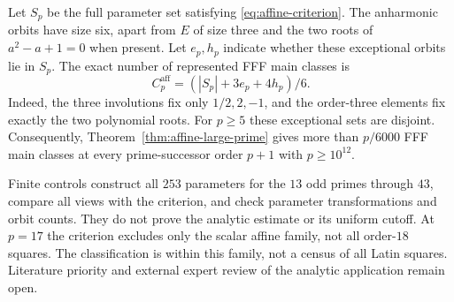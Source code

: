 Let $S_p$ be the full parameter set satisfying
\eqref{eq:affine-criterion}. The anharmonic orbits have size six,
apart from $E$ of size three and the two roots of $a^2-a+1=0$
when present. Let $e_p,h_p$ indicate whether these exceptional
orbits lie in $S_p$. The exact number of represented FFF main
classes is
\[
 C_p^{\mathrm{aff}}=(|S_p|+3e_p+4h_p)/6.
\]
Indeed, the three involutions fix only $1/2,2,-1$, and the
order-three elements fix exactly the two polynomial roots.
For $p\geq5$ these exceptional sets are disjoint. Consequently,
Theorem~\ref{thm:affine-large-prime} gives more than $p/6000$
FFF main classes at every prime-successor order $p+1$ with
$p\geq10^{12}$.

Finite controls construct all $253$ parameters for the $13$ odd
primes through $43$, compare all views with the criterion, and
check parameter transformations and orbit counts. They do not
prove the analytic estimate or its uniform cutoff. At $p=17$
the criterion excludes only the scalar affine family, not all
order-$18$ squares. The classification is within this family,
not a census of all Latin squares. Literature priority and external
expert review of the analytic application remain open.
